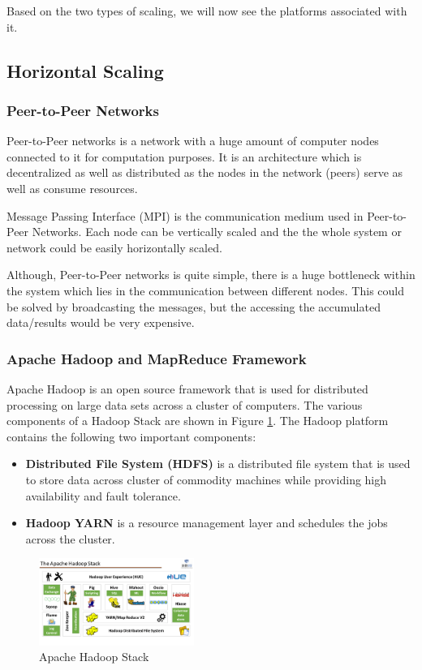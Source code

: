 \documentclass[journal]{IEEEtran}
\begin{document}
Based on the two types of scaling, we will now see the platforms associated with it. \cite{Singh2014}

\subsection{Horizontal Scaling}

\subsubsection{\textbf{Peer-to-Peer Networks}}
Peer-to-Peer networks \cite{Singh2014} \cite{milojicic2002peer} \cite{steinmetz2005peer} is a network with a huge amount of computer nodes connected to it for computation purposes. It is an architecture which is decentralized as well as distributed as the nodes in the network (peers) serve as well as consume resources.

Message Passing Interface (MPI) is the communication medium used in Peer-to-Peer Networks. Each node can be vertically scaled and the the whole system or network could be easily horizontally scaled.

Although, Peer-to-Peer networks is quite simple, there is a huge bottleneck within the system which lies in the communication between different nodes. This could be solved by broadcasting the messages, but the accessing the accumulated data/results would be very expensive.

\subsubsection{\textbf{Apache Hadoop and MapReduce Framework}}
Apache Hadoop is an open source framework that is used for distributed processing on large data sets across a cluster of computers. The various components of a Hadoop Stack are shown in Figure \ref{stack}. The Hadoop platform contains the following two important components:
\begin{itemize}
\item \textbf{Distributed File System (HDFS)} \cite{borthakurhdfs} is a distributed file system that is used to store data across cluster of commodity machines while providing high availability and fault tolerance.
\item \textbf{Hadoop YARN} \cite{vavilapalli2013apache} is a resource management layer and schedules the jobs across the cluster.
\end{itemize}
\begin{figure}
\centering
\includegraphics[width=0.45\textwidth]{hadoop-stack.png}
\caption{Apache Hadoop Stack \cite{spanish}}
\label{stack}
\end{figure}
\end{document}
